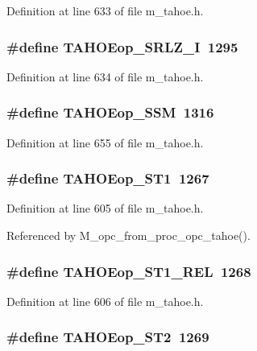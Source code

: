 Definition at line 633 of file m\_\-tahoe.h.
\subsubsection{\setlength{\rightskip}{0pt plus 5cm}\#define TAHOEop\_\-SRLZ\_\-I~1295}\label{m__tahoe_8h_7651c70597d93fddc26687be6f9ce9a2}




Definition at line 634 of file m\_\-tahoe.h.
\subsubsection{\setlength{\rightskip}{0pt plus 5cm}\#define TAHOEop\_\-SSM~1316}\label{m__tahoe_8h_20193891100600eadf5dcd9ecc3d9a69}




Definition at line 655 of file m\_\-tahoe.h.
\subsubsection{\setlength{\rightskip}{0pt plus 5cm}\#define TAHOEop\_\-ST1~1267}\label{m__tahoe_8h_fed8abb36220427f30d7a3dc9a631c74}




Definition at line 605 of file m\_\-tahoe.h.

Referenced by M\_\-opc\_\-from\_\-proc\_\-opc\_\-tahoe().
\subsubsection{\setlength{\rightskip}{0pt plus 5cm}\#define TAHOEop\_\-ST1\_\-REL~1268}\label{m__tahoe_8h_e5f4f7a472f377b89f9eee25e004d675}




Definition at line 606 of file m\_\-tahoe.h.
\subsubsection{\setlength{\rightskip}{0pt plus 5cm}\#define TAHOEop\_\-ST2~1269}\label{m__tahoe_8h_38ba6c7861468be401eb8219f041c6b2}




